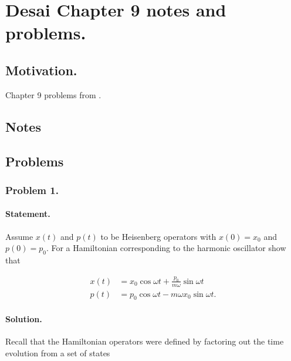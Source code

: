 %
%

\chapter{Desai Chapter 9 notes and problems.}
\label{chap:desaiCh9}
{}
\date{Nov 19, 2010}

\beginArtWithToc

\section{Motivation.}

Chapter 9 problems from \citep{desai2009quantum}.

\section{Notes}
\section{Problems}

\subsection{Problem 1.}
\subsubsection{Statement.}

Assume $x(t)$ and $p(t)$ to be Heisenberg operators with $x(0) = x_0$ and $p(0) = p_0$.  For a Hamiltonian corresponding to the harmonic oscillator show that 

\begin{align}\label{eqn:desaiCh9:100}
x(t) &= x_0 \cos \omega t + \frac{p_0}{m \omega} \sin \omega t \\
p(t) &= p_0 \cos \omega t - m \omega x_0 \sin \omega t.
\end{align}

\subsubsection{Solution.}

Recall that the Hamiltonian operators were defined by factoring out the time evolution from a set of states

